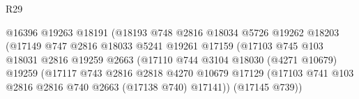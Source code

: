 \begin{lexlean}{R29}
\begin{coremodule}
                                          @16396
                                          @19263
                                          @18191
                                          (@18193
                                            @748
                                            @2816
                                            @18034
                                            @5726
                                            @19262
                                            @18203
                                            (@17149
                                              @747
                                              @2816
                                              @18033
                                              @5241
                                              @19261
                                              @17159
                                              (@17103
                                                @745
                                                @103
                                                @18031
                                                @2816
                                                @19259
                                                @2663
                                                (@17110
                                                  @744
                                                  @3104
                                                  @18030
                                                  (@4271 @10679)
                                                  @19259
                                                  (@17117
                                                    @743
                                                    @2816
                                                    @2818
                                                    @4270
                                                    @10679
                                                    @17129
                                                    (@17103
                                                      @741
                                                      @103
                                                      @2816
                                                      @2816
                                                      @740
                                                      @2663
                                                      (@17138 @740)
                                                      @17141))
                                                  (@17145 @739))

\end{coremodule}
\end{lexlean}
